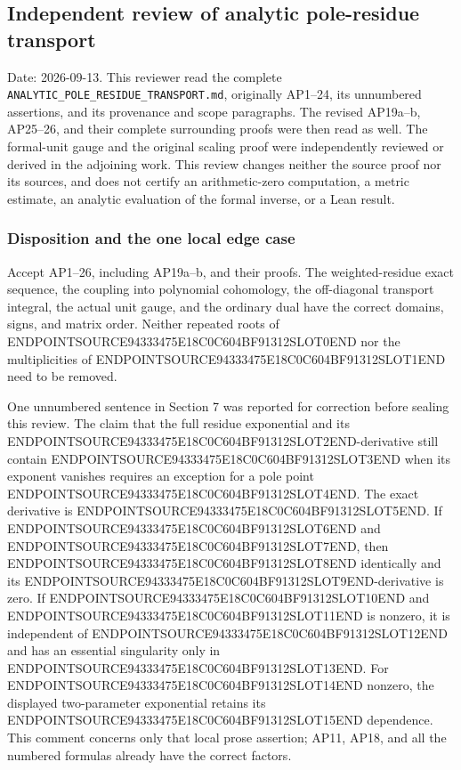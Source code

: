 \subsection{Independent review of analytic pole-residue transport}\label{endpoint-analytic_pole_review--independent-review-of-analytic-pole-residue-transport}

Date: 2026-09-13. This reviewer read the complete \texttt{ANALYTIC\_POLE\_RESIDUE\_TRANSPORT.md}, originally AP1--24, its unnumbered assertions, and its provenance and scope paragraphs. The revised AP19a--b, AP25--26, and their complete surrounding proofs were then read as well. The formal-unit gauge and the original scaling proof were independently reviewed or derived in the adjoining work. This review changes neither the source proof nor its sources, and does not certify an arithmetic-zero computation, a metric estimate, an analytic evaluation of the formal inverse, or a Lean result.

\subsubsection{Disposition and the one local edge case}\label{endpoint-analytic_pole_review--disposition-and-the-one-local-edge-case}

Accept AP1--26, including AP19a--b, and their proofs. The weighted-residue exact sequence, the coupling into polynomial cohomology, the off-diagonal transport integral, the actual unit gauge, and the ordinary dual have the correct domains, signs, and matrix order. Neither repeated roots of ENDPOINTSOURCE94333475E18C0C604BF91312SLOT0END nor the multiplicities of ENDPOINTSOURCE94333475E18C0C604BF91312SLOT1END need to be removed.

One unnumbered sentence in Section 7 was reported for correction before sealing this review. The claim that the full residue exponential and its ENDPOINTSOURCE94333475E18C0C604BF91312SLOT2END-derivative still contain ENDPOINTSOURCE94333475E18C0C604BF91312SLOT3END when its exponent vanishes requires an exception for a pole point ENDPOINTSOURCE94333475E18C0C604BF91312SLOT4END. The exact derivative is ENDPOINTSOURCE94333475E18C0C604BF91312SLOT5END. If ENDPOINTSOURCE94333475E18C0C604BF91312SLOT6END and ENDPOINTSOURCE94333475E18C0C604BF91312SLOT7END, then ENDPOINTSOURCE94333475E18C0C604BF91312SLOT8END identically and its ENDPOINTSOURCE94333475E18C0C604BF91312SLOT9END-derivative is zero. If ENDPOINTSOURCE94333475E18C0C604BF91312SLOT10END and ENDPOINTSOURCE94333475E18C0C604BF91312SLOT11END is nonzero, it is independent of ENDPOINTSOURCE94333475E18C0C604BF91312SLOT12END and has an essential singularity only in ENDPOINTSOURCE94333475E18C0C604BF91312SLOT13END. For ENDPOINTSOURCE94333475E18C0C604BF91312SLOT14END nonzero, the displayed two-parameter exponential retains its ENDPOINTSOURCE94333475E18C0C604BF91312SLOT15END dependence. This comment concerns only that local prose assertion; AP11, AP18, and all the numbered formulas already have the correct factors.

